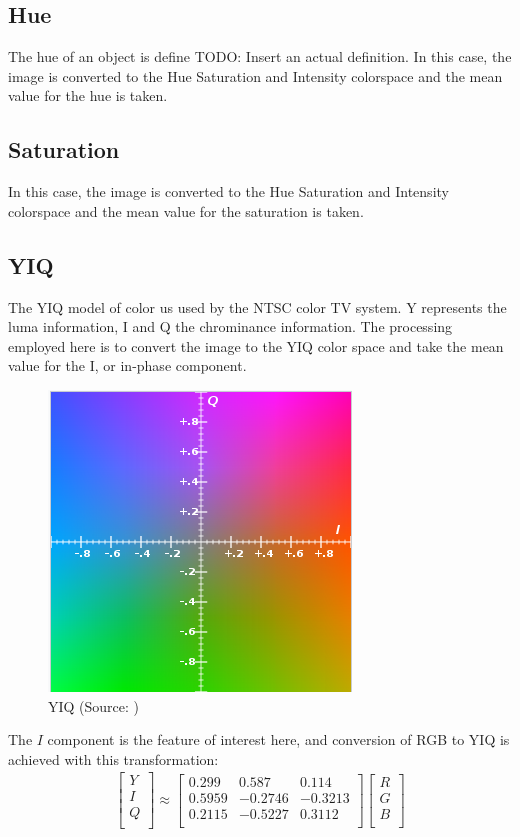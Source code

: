 \documentclass[letterpaper]{article}
\begin{document}
{\subsection{Hue}
The hue of an object is define TODO: Insert an actual definition. In this case, the image is converted to the Hue Saturation and Intensity colorspace and the mean value for the hue is taken.
\subsection{Saturation}
In this case, the image is converted to the Hue Saturation and Intensity colorspace and the mean value for the saturation is taken.
\subsection{YIQ}
The YIQ model of color us used by the NTSC color TV system. Y represents the luma information, I and Q the chrominance information. The processing employed here is to convert the image to the YIQ color space and take the mean value for the I, or in-phase component.
\begin{figure}[h!]
	\centering
	\includegraphics[width=0.4\linewidth]{./figures/yiq.png}
	\caption{YIQ (Source: \cite{Various_undated-cz})}
	\label{fig:yiq}
\end{figure}
The $I$ component is the feature of interest here, and conversion of RGB to YIQ is achieved with this transformation:
\begin{eqnarray*}
	\begin{bmatrix}
	Y \\[0.3em]
	I \\[0.3em]
	Q \\[0.3em]
	\end{bmatrix}
	\approx
	\begin{bmatrix}
	0.299 & 0.587 & 0.114 \\[0.3em]
	0.5959 & -0.2746 & -0.3213\\[0.3em]
	0.2115 & -0.5227 & 0.3112 \\[0.3em]
	\end{bmatrix}
	\begin{bmatrix}
	R \\[0.3em]
	G \\[0.3em]
	B \\[0.3em]
	\end{bmatrix}	
\end{eqnarray*}

}
\end{document}

